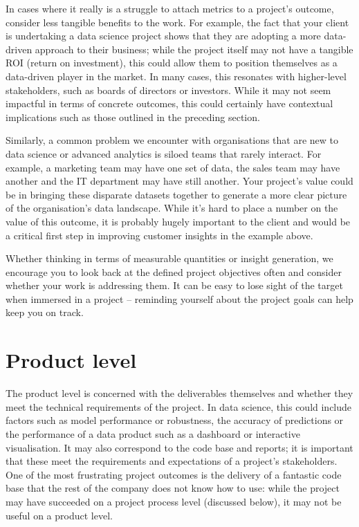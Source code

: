 \documentclass[
]{book}
\begin{document}
In cases where it really is a struggle to attach metrics to a project's outcome, consider less tangible benefits to the work. For example, the fact that your client is undertaking a data science project shows that they are adopting a more data-driven approach to their business; while the project itself may not have a tangible ROI (return on investment), this could allow them to position themselves as a data-driven player in the market. In many cases, this resonates with higher-level stakeholders, such as boards of directors or investors. While it may not seem impactful in terms of concrete outcomes, this could certainly have contextual implications such as those outlined in the preceding section.

Similarly, a common problem we encounter with organisations that are new to data science or advanced analytics is siloed teams that rarely interact. For example, a marketing team may have one set of data, the sales team may have another and the IT department may have still another. Your project's value could be in bringing these disparate datasets together to generate a more clear picture of the organisation's data landscape. While it's hard to place a number on the value of this outcome, it is probably hugely important to the client and would be a critical first step in improving customer insights in the example above.

Whether thinking in terms of measurable quantities or insight generation, we encourage you to look back at the defined project objectives often and consider whether your work is addressing them. It can be easy to lose sight of the target when immersed in a project -- reminding yourself about the project goals can help keep you on track.

\hypertarget{product-level}{%
\section{Product level}\label{product-level}}

The product level is concerned with the deliverables themselves and whether they meet the technical requirements of the project. In data science, this could include factors such as model performance or robustness, the accuracy of predictions or the performance of a data product such as a dashboard or interactive visualisation. It may also correspond to the code base and reports; it is important that these meet the requirements and expectations of a project's stakeholders. One of the most frustrating project outcomes is the delivery of a fantastic code base that the rest of the company does not know how to use: while the project may have succeeded on a project process level (discussed below), it may not be useful on a product level.
\end{document}
